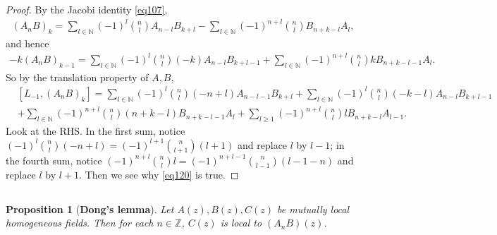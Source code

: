 \documentclass[12pt,a4paper,notitlepage]{article}
\theoremstyle{definition}
\theoremstyle{plain}
\newtheorem{pp}[df]{Proposition}
\newcommand{\Nbb}{\mathbb N}
\newcommand{\Zbb}{\mathbb Z}
\numberwithin{equation}{section}
\begin{document}
\begin{proof}
By the Jacobi identity \eqref{eq107},
\begin{align}
(A_nB)_k=\sum_{l\in\Nbb}(-1)^l{n\choose l}A_{n-l}B_{k+l}-\sum_{l\in\Nbb}(-1)^{n+l}{n\choose l}B_{n+k-l}A_l, \label{eq126}	
\end{align}
and hence
\begin{align*}
-k(A_nB)_{k-1}=\sum_{l\in\Nbb}(-1)^l{n\choose l}(-k)A_{n-l}B_{k+l-1}+\sum_{l\in\Nbb}(-1)^{n+l}{n\choose l}kB_{n+k-l-1}A_l.	
\end{align*}
So by the translation property of $A,B$,
\begin{align*}
&[L_{-1},(A_nB)_k]=\sum_{l\in\Nbb}(-1)^l{n\choose l}(-n+l)A_{n-l-1}B_{k+l}+\sum_{l\in\Nbb}(-1)^l{n\choose l}(-k-l)A_{n-l}B_{k+l-1}\\
&+\sum_{l\in\Nbb}(-1)^{n+l}{n\choose l}(n+k-l)B_{n+k-l-1}A_l+\sum_{l\geq1}(-1)^{n+l}{n\choose l}lB_{n+k-l}A_{l-1}.
\end{align*}
Look at the RHS. In the first sum, notice  $(-1)^l{n\choose l}(-n+l)=(-1)^{l+1}{n\choose l+1}(l+1)$ and replace $l$ by $l-1$; in the fourth sum, notice $(-1)^{n+l}{n\choose l}l=(-1)^{n+l-1}{n\choose l-1}(l-1-n)$ and replace $l$ by $l+1$. Then we see why \eqref{eq120} is true.
\end{proof}



\subsection{}\label{lb86}

\begin{pp}[\textbf{Dong's lemma}]
Let $A(z),B(z),C(z)$ be mutually local homogeneous fields. Then for each $n\in\Zbb$, $C(z)$ is local to $(A_nB)(z)$. 
\end{pp}
\end{document}
